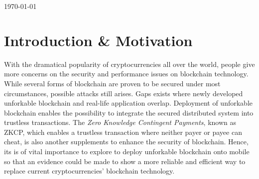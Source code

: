 \begin{titlepage}


{\large \today}\\[2cm] %


 


\end{titlepage}





\section{Introduction \& Motivation}

With the dramatical popularity of cryptocurrencies all over the world, people give more concerns on the security and performance issues on blockchain technology. While several forms of blockchain are proven to be secured under most circumstances, possible attacks still arises. Gaps exists where newly developed unforkable blockchain and real-life application overlap. Deployment of unforkable blockchain enables the possibility to integrate the secured distributed system into trustless transactions. The \textit{Zero Knowledge Contingent Payments}, known as ZKCP, which enables a trustless transaction where neither payer or payee can cheat, is also another supplements to enhance the security of blockchain. Hence, its is of vital importance to explore to deploy unforkable blockchain onto mobile so that an evidence could be made to show a more reliable and efficient way to replace current cryptocurrencies' blockchain technology. 


